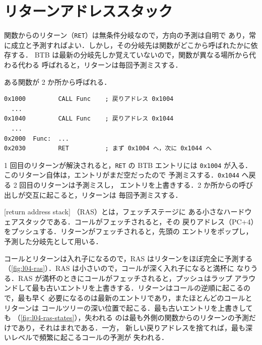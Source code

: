 \documentclass[../main.tex]{subfiles}
\begin{document}
\section{リターンアドレススタック}
\label{sec:l04-ras}

関数からのリターン（\texttt{RET}）は無条件分岐なので，方向の予測は自明で
あり，常に成立と予測すればよい．しかし，その分岐先は関数がどこから呼ばれたかに依存する．
BTB は最新の分岐先しか覚えていないので，関数が異なる場所から代わる代わる
呼ばれると，リターンは毎回予測ミスする．

\begin{example}
  ある関数が 2 か所から呼ばれる．
  \begin{lstlisting}[language={[x86masm]Assembler}, numbers=none]
0x1000         CALL Func    ; 戻りアドレス 0x1004
  ...
0x1040         CALL Func    ; 戻りアドレス 0x1044
  ...
0x2000  Func:  ...
0x2030         RET          ; まず 0x1004 へ，次に 0x1044 へ
\end{lstlisting}
  1 回目のリターンが解決されると，\texttt{RET} の BTB エントリには
  \texttt{0x1004} が入る．このリターン自体は，エントリがまだ空だったので
  予測ミスする．\texttt{0x1044} へ戻る 2 回目のリターンは予測ミスし，
  エントリを上書きする．2 か所からの呼び出しが交互に起こると，リターンは
  毎回予測ミスする．
\end{example}

\begin{definition}[リターンアドレススタック]
  [return address stack]%
  （RAS）とは，フェッチステージに
  ある小さなハードウェアスタックである．コールがフェッチされると，その
  戻りアドレス（PC+4）をプッシュする．リターンがフェッチされると，先頭の
  エントリをポップし，予測した分岐先として用いる．
\end{definition}

コールとリターンは入れ子になるので，RAS はリターンをほぼ完全に予測する
（\cref{fig:l04-ras}）．RAS は小さいので，コールが深く入れ子になると満杯に
なりうる．RAS が満杯のときにコールがフェッチされると，プッシュはラップ
アラウンドして最も古いエントリを上書きする．リターンはコールの逆順に起こるので，最も早く
必要になるのは最新のエントリであり，またほとんどのコールとリターンは
コールツリーの深い位置で起こる．最も古いエントリを上書きしても
（\cref{fig:l04-ras-states}），失われる
のは最も外側の関数からのリターンの予測だけであり，それはまれである．一方，
新しい戻りアドレスを捨てれば，最も深いレベルで頻繁に起こるコールの予測が
失われる．
\end{document}
